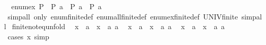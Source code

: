 \begin{isabellebody}
\isanewline
{}\isamarkupfalse%
\isanewline
\ \ {\isachardoublequoteopen}enum{\isacharunderscore}{\kern0pt}ex\ P\ {\isasymlongleftrightarrow}\ P\ a\ {\isasymor}\ P\ a\ {\isasymor}\ P\ a\isanewline
\isanewline
{}\isamarkupfalse%
%
\isadelimproof
\ %
\endisadelimproof
%
\isatagproof
{}\isamarkupfalse%
\isanewline
{}\isamarkupfalse%
\ {\isacharparenleft}{\kern0pt}simp{\isacharunderscore}{\kern0pt}all\ only{\isacharcolon}{\kern0pt}\ enum{\isacharunderscore}{\kern0pt}finite{\isacharunderscore}{\kern0pt}{}{\isacharunderscore}{\kern0pt}def\ enum{\isacharunderscore}{\kern0pt}all{\isacharunderscore}{\kern0pt}finite{\isacharunderscore}{\kern0pt}{}{\isacharunderscore}{\kern0pt}def\ enum{\isacharunderscore}{\kern0pt}ex{\isacharunderscore}{\kern0pt}finite{\isacharunderscore}{\kern0pt}{}{\isacharunderscore}{\kern0pt}def\ UNIV{\isacharunderscore}{\kern0pt}finite{\isacharunderscore}{\kern0pt}{}{\isacharcomma}{\kern0pt}\ simp{\isacharunderscore}{\kern0pt}all{\isacharparenright}{\kern0pt}%
\endisatagproof
{\isafoldproof}%
%
\isadelimproof
%
\endisadelimproof
\isanewline
\isanewline
{}\isamarkupfalse%
\isanewline
\isanewline
{}\isamarkupfalse%
\ finite{\isacharunderscore}{\kern0pt}{}{\isacharunderscore}{\kern0pt}not{\isacharunderscore}{\kern0pt}eq{\isacharunderscore}{\kern0pt}unfold{\isacharcolon}{\kern0pt}\isanewline
\ \ {\isachardoublequoteopen}x\ {\isasymnoteq}\ a\ {\isasymlongleftrightarrow}\ x\ {\isasymin}\ {\isacharbraceleft}{\kern0pt}a\ a\isanewline
\ \ {\isachardoublequoteopen}x\ {\isasymnoteq}\ a\ {\isasymlongleftrightarrow}\ x\ {\isasymin}\ {\isacharbraceleft}{\kern0pt}a\ a\isanewline
\ \ {\isachardoublequoteopen}x\ {\isasymnoteq}\ a\ {\isasymlongleftrightarrow}\ x\ {\isasymin}\ {\isacharbraceleft}{\kern0pt}a\ a\isanewline
%
\isadelimproof
\ \ %
\endisadelimproof
%
\isatagproof
{}\isamarkupfalse%
\ {\isacharparenleft}{\kern0pt}cases\ x{\isacharsemicolon}{\kern0pt}\ simp{\isacharparenright}{\kern0pt}{\isacharplus}{\kern0pt}%

\end{isabellebody}
